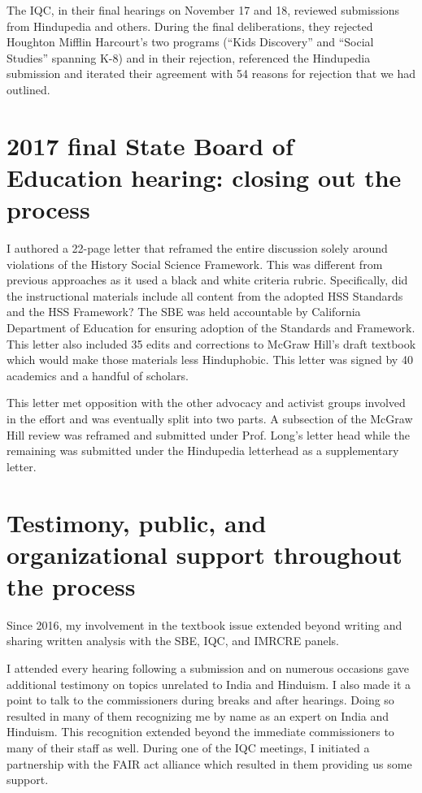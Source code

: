 The IQC, in their final hearings on November 17 and 18, reviewed submissions from Hindupedia and others. During the final deliberations, they rejected Houghton Mifflin Harcourt’s two programs (“Kids Discovery” and “Social Studies” spanning K-8) and in their rejection, referenced the Hindupedia submission and iterated their agreement with 54 reasons for rejection that we had outlined. 


\section*{2017 final State Board of Education hearing: closing out the process}

I authored a 22-page letter that reframed the entire discussion solely around violations of the History Social Science Framework. This was different from previous approaches as it used a black and white criteria rubric. Specifically, did the instructional materials include all content from the adopted HSS Standards and the HSS Framework? The SBE was held accountable by California Department of Education for ensuring adoption of the Standards and Framework. This letter also included 35 edits and corrections to McGraw Hill’s draft textbook which would make those materials less Hinduphobic. This letter was signed by 40 academics and a handful of scholars. 

This letter met opposition with the other advocacy and activist groups involved in the effort and was eventually split into two parts. A subsection of the McGraw Hill review was reframed and submitted under Prof. Long’s letter head while the remaining was submitted under the Hindupedia letterhead as a supplementary letter.


\section*{Testimony, public, and organizational support throughout the process}

Since 2016, my involvement in the textbook issue extended beyond writing and sharing written analysis with the SBE, IQC, and IMRCRE panels. 

I attended every hearing following a submission and on numerous occasions gave additional testimony on topics unrelated to India and Hinduism. I also made it a point to talk to the commissioners during breaks and after hearings. Doing so resulted in many of them recognizing me by name as an expert on India and Hinduism. This recognition extended beyond the immediate commissioners to many of their staff as well. During one of the IQC meetings, I initiated a partnership with the FAIR act alliance which resulted in them providing us some support.

